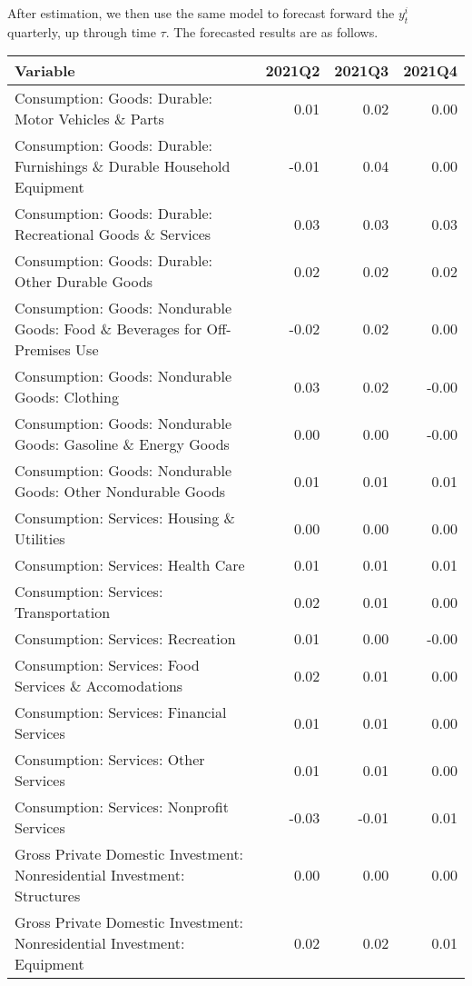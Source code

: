 \documentclass[11pt, letterpaper]{article}\usepackage[]{graphicx}\usepackage[]{color}
\begin{document}
After estimation, we then use the same model to forecast forward the $y^i_t$ quarterly, up through time $\tau$. 
The forecasted results are as follows.
\begin{table}[H]
\centering
\begingroup\scriptsize
\begin{tabular}{lrrr}
  \hline
Variable & 2021Q2 & 2021Q3 & 2021Q4 \\ 
  \hline
Consumption: Goods: Durable: Motor Vehicles \& Parts & 0.01 & 0.02 & 0.00 \\ 
  Consumption: Goods: Durable: Furnishings \& Durable Household Equipment & -0.01 & 0.04 & 0.00 \\ 
  Consumption: Goods: Durable: Recreational Goods \& Services & 0.03 & 0.03 & 0.03 \\ 
  Consumption: Goods: Durable: Other Durable Goods & 0.02 & 0.02 & 0.02 \\ 
  Consumption: Goods: Nondurable Goods: Food \& Beverages for Off-Premises Use & -0.02 & 0.02 & 0.00 \\ 
  Consumption: Goods: Nondurable Goods: Clothing & 0.03 & 0.02 & -0.00 \\ 
  Consumption: Goods: Nondurable Goods: Gasoline \& Energy Goods & 0.00 & 0.00 & -0.00 \\ 
  Consumption: Goods: Nondurable Goods: Other Nondurable Goods & 0.01 & 0.01 & 0.01 \\ 
  Consumption: Services: Housing \& Utilities & 0.00 & 0.00 & 0.00 \\ 
  Consumption: Services: Health Care & 0.01 & 0.01 & 0.01 \\ 
  Consumption: Services: Transportation & 0.02 & 0.01 & 0.00 \\ 
  Consumption: Services: Recreation & 0.01 & 0.00 & -0.00 \\ 
  Consumption: Services: Food Services \& Accomodations & 0.02 & 0.01 & 0.00 \\ 
  Consumption: Services: Financial Services & 0.01 & 0.01 & 0.00 \\ 
  Consumption: Services: Other Services & 0.01 & 0.01 & 0.00 \\ 
  Consumption: Services: Nonprofit Services & -0.03 & -0.01 & 0.01 \\ 
  Gross Private Domestic Investment: Nonresidential Investment: Structures & 0.00 & 0.00 & 0.00 \\ 
  Gross Private Domestic Investment: Nonresidential Investment: Equipment & 0.02 & 0.02 & 0.01 \\ 

\end{tabular}
\end{table}
\end{document}
